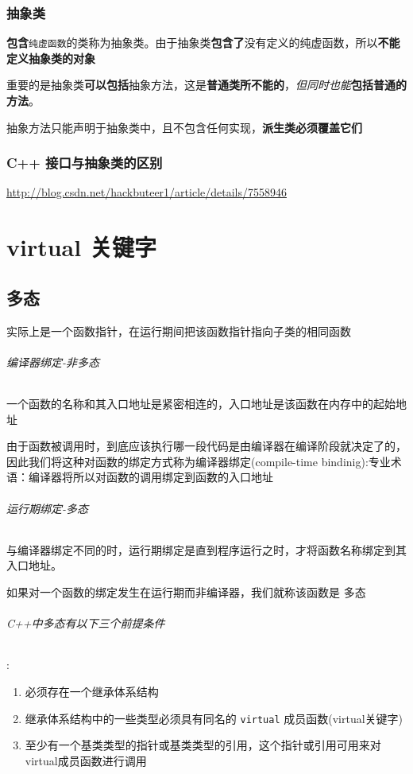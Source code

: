 \documentclass[UTF8,a4paper,12pt]{ctexbook} %
\begin{document}
		\subsection{抽象类}
			\textbf{包含}\verb|纯虚函数|的类称为抽象类。由于抽象类\textbf{包含了}没有定义的纯虚函数，所以\textbf{不能定义抽象类的对象}
	      
		    重要的是抽象类\textbf{可以包括}抽象方法，这是\textbf{普通类所不能的}，\textit{但同时也能}\textbf{包括普通的方法}。
		    
		    抽象方法只能声明于抽象类中，且不包含任何实现，\textbf{派生类必须覆盖它们}
		    
		 \subsection{C++ 接口与抽象类的区别}
			 \url{http://blog.csdn.net/hackbuteer1/article/details/7558946}
		 
		 
\chapter{virtual  关键字}
	\section{多态}实际上是一个函数指针，在运行期间把该函数指针指向子类的相同函数
		
		\subparagraph{编译器绑定-非多态}一个函数的名称和其入口地址是紧密相连的，入口地址是该函数在内存中的起始地址
		
		由于函数被调用时，到底应该执行哪一段代码是由编译器在编译阶段就决定了的，因此我们将这种对函数的绑定方式称为编译器绑定(compile-time  bindinig):专业术语：编译器将所以对函数的调用绑定到函数的入口地址
		
		\subparagraph{运行期绑定-多态}与编译器绑定不同的时，运行期绑定是直到程序运行之时，才将函数名称绑定到其入口地址。
		
		如果对一个函数的绑定发生在运行期而非编译器，我们就称该函数是   多态
		
		\subparagraph{C++中多态有以下三个前提条件}:
			\begin{enumerate}[fullwidth,itemindent = 2em]
				\item 必须存在一个继承体系结构
				\item 继承体系结构中的一些类型必须具有同名的 \verb|virtual| 成员函数(virtual关键字)
				\item 至少有一个基类类型的指针或基类类型的引用，这个指针或引用可用来对virtual成员函数进行调用
			\end{enumerate}
		
\end{document}
